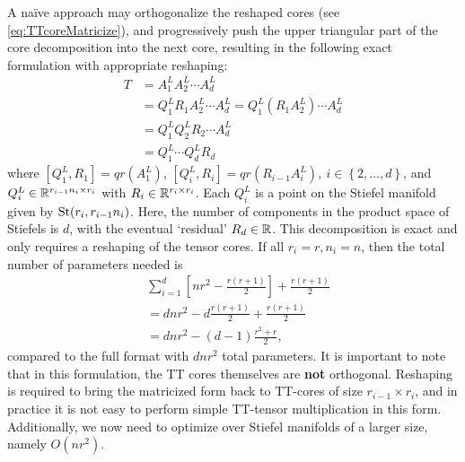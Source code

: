 A na\"ive approach may orthogonalize the reshaped cores (see \eqref{eq:TTcoreMatricize}), and progressively push the upper triangular part of the core decomposition into the next core, resulting in the following exact formulation with appropriate reshaping:
\begin{align}
    T &= A_1^L A_2^L\cdots A_d^L \nonumber\\
    &= Q_1^L R_1 A_2^L \cdots A_d^L = Q_1^L \left(R_1 A_2^L\right) \cdots A_d^L \nonumber\\ 
    &= Q_1^L Q_2^L R_2 \cdots A_d^L \nonumber\\
    &= Q_1^L \cdots Q_d^L R_d \label{eq:eott}
\end{align}
where $ [Q_1^L, R_1] = qr(A_1^L) $, $ [Q_i^L, R_i] = qr(R_{i-1} A_i^L ), \ i \in \left \{2,\ldots,d \right \}$, and $ Q_i^L \in \mathbb{R}^{r_{i-1} n_i \times r_i}$ with $R_i \in \mathbb{R}^{r_i \times r_i}$. 
Each $Q_i^L$ is a point on the Stiefel manifold given by $\text{St}(r_i, r_{i-1}n_i)$. Here, the number of components in the product space of Stiefels is $d$, with the eventual `residual' $R_d \in \mathbb{R}$. This decomposition is exact and only requires a reshaping of the tensor cores.
If all $r_i = r, n_i = n$,
then the total number of parameters needed is
\begin{align*}
    &\sum_{i=1}^d \left[nr^2 - \frac{r(r + 1)}{2}\right] + \frac{r(r+1)}{2} \\
    &= d n r^2 - d\frac{r(r + 1)}{2} + \frac{r(r+1)}{2} \\
    &= d n r^2 - (d-1)\frac{r^2 + r}{2},
\end{align*}
compared to the full format with $dnr^2$ total parameters.
It is important to note that in this formulation, the TT cores themselves are \textbf{not} orthogonal. Reshaping is required to bring the matricized form back to TT-cores of size $r_{i-1} \times r_i$, and in practice it is not easy to perform simple TT-tensor multiplication in this form. Additionally, we now need to optimize over Stiefel manifolds of a larger size, namely $O(nr^2)$.

